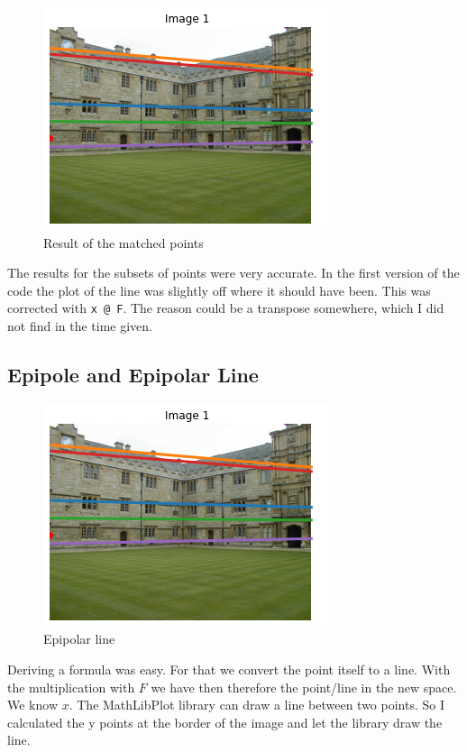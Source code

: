 \documentclass[12pt]{article}
\begin{document}
\begin{figure}[h!]
    \centering
    \includegraphics[scale=0.5]{eight_points.png}
    \caption{Result of the matched points}
\end{figure}

The results for the subsets of points were very accurate. In the first version of the 
code the plot of the line was slightly off where it should have been. This was corrected with
\texttt{x @ F}. The reason could be a transpose somewhere, which I did not find in the time given.

\subsection{Epipole and Epipolar Line}

\begin{figure}[h!]
    \centering
    \includegraphics[scale=0.5]{eight_points.png}
    \caption{Epipolar line}
\end{figure}

Deriving a formula was easy. For that we convert the point itself to a line. With the multiplication with
$F$ we have then therefore the point/line in the new space. We know $x$. The MathLibPlot library can draw a line
between two points. So I calculated the y points at the border of the image and let the library draw the line.
\end{document}
